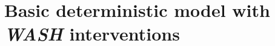 \documentclass[12pt,a4paper]{article}
\theoremstyle{plain}%
\theoremstyle{definition}
\theoremstyle{remark}
\begin{document}
	
	
%	
	\section{Basic deterministic model with \textit{WASH} interventions}\label{sec:model1}
\end{document}
